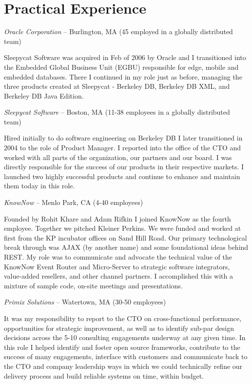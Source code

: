 \documentclass[letterpaper]{article}
\renewenvironment{itemize}{
  \begin{list}{}{
    \setlength{\leftmargin}{1.5em}
  }
}{
  \end{list}
}
\begin{document}
\section*{Practical Experience}

\begin{itemize}
\item {\it Oracle Corporation} -- Burlington, MA (45 employed in a globally distributed team)

Sleepycat Software was acquired in Feb of 2006 by Oracle and I transitioned into the Embedded Global Business Unit (EGBU) responsible for edge, mobile and embedded databases. There I continued in my role just as before, managing the three products created at Sleepycat - Berkeley DB, Berkeley DB XML, and Berkeley DB Java Edition.

\item {\it Sleepycat Software} -- Boston, MA (11-38 employees in a globally distributed team)

Hired initially to do software engineering on Berkeley DB I later transitioned in 2004 to the role of Product Manager. I reported into the office of the CTO and worked with all parts of the organization, our partners and our board. I was directly responsible for the success of our products in their respective markets. I launched two highly successful products and continue to enhance and maintain them today in this role.

\item {\it KnowNow} -- Menlo Park, CA (4-40 employees)

Founded by Rohit Khare and Adam Rifkin I joined KnowNow as the fourth employee. Together we pitched Kleiner Perkins. We were funded and worked at first from the KP incubator offices on Sand Hill Road. Our primary technological break through was AJAX (by another name) and some foundational ideas behind REST. My role was to communicate and advocate the technical value of the KnowNow Event Router and Micro-Server to strategic software integrators, value-added resellers, and other channel partners. I accomplished this with a mixture of sample code, on-site meetings and presentations.

\item {\it Primix Solutions} -- Watertown, MA (30-50 employees)

It was my responsibility to report to the CTO on cross-functional performance, opportunities for strategic improvement, as well as to identify sub-par design decisions across the 5-10 consulting engagements underway at any given time. In this role I helped identify and foster open source frameworks, contribute to the success of many engagements, interface with customers and communicate back to the CTO and company leadership ways in which we could technically refine our delivery process and build reliable systems on time, within budget.


\end{itemize}
\end{document}
